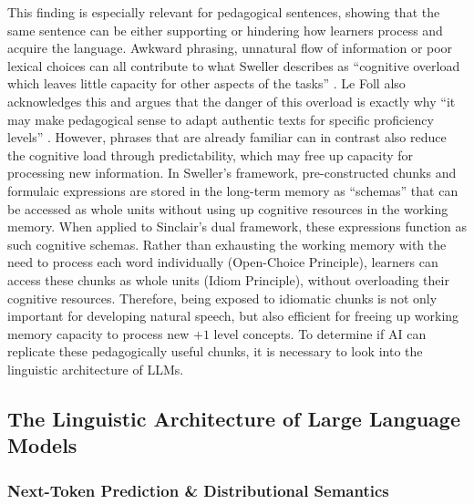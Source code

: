 \documentclass[11pt,a4paper]{article}
\begin{document}
This finding is especially relevant for pedagogical sentences, showing that the same sentence can be either supporting or hindering how learners process and acquire the language. Awkward phrasing, unnatural flow of information or poor lexical choices can all contribute to what Sweller describes as ``cognitive overload which leaves little capacity for other aspects of the tasks'' \parencite[276]{swellerCognitiveLoadProblem1988a}. Le Foll also acknowledges this and argues that the danger of this overload is exactly why ``it may make pedagogical sense to adapt authentic texts for specific proficiency levels'' \parencite[219]{leFoll2024}. However, phrases that are already familiar can in contrast also reduce the cognitive load through predictability, which may free up capacity for processing new information. In Sweller's framework, pre-constructed chunks and formulaic expressions are stored in the long-term memory as ``schemas'' that can be accessed as whole units without using up cognitive resources in the working memory. When applied to Sinclair's dual framework, these expressions function as such cognitive schemas. Rather than exhausting the working memory with the need to process each word individually (Open-Choice Principle), learners can access these chunks as whole units (Idiom Principle), without overloading their cognitive resources. Therefore, being exposed to idiomatic chunks is not only important for developing natural speech, but also efficient for freeing up working memory capacity to process new $+1$ level concepts. To determine if AI can replicate these pedagogically useful chunks, it is necessary to look into the linguistic architecture of LLMs.

\subsection{The Linguistic Architecture of Large Language Models}\label{subsec:llm-architecture}

\subsubsection{Next-Token Prediction \& Distributional Semantics}\label{subsubsec:ntp-semantics}
\end{document}
